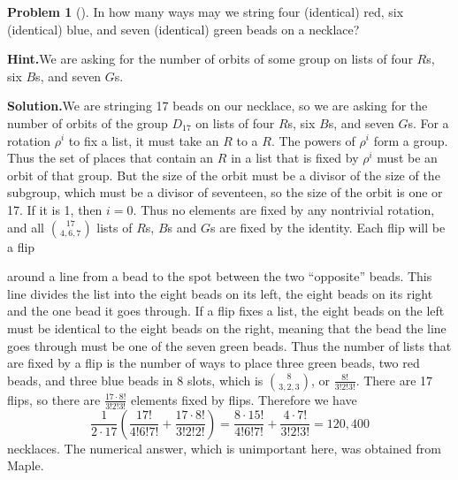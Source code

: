 \documentclass[10pt,]{book}
\theoremstyle{plain}
\theoremstyle{definition}
\newtheorem{activity}[project]{Problem}
\theoremstyle{definition}
\numberwithin{equation}{chapter}
\begin{document}
\begin{activity}[]\label{activity-301}
In how many ways may we string four (identical) red, six (identical) blue, and seven (identical) green beads on a necklace?%
\par\medskip\noindent%
\textbf{Hint.}\quad We are asking for the number of orbits of some group on lists of four \(R\)s, six \(B\)s, and seven \(G\)s.%
\par\medskip\noindent%
\textbf{Solution.}\quad We are stringing 17 beads on our necklace, so we are asking for the number of orbits of the group \(D_{17}\) on lists of four \(R\)s, six \(B\)s, and seven \(G\)s. For a rotation \(\rho^i\) to fix a list, it must take an \(R\) to a \(R\). The powers of \(\rho^i\) form a group. Thus the set of places that contain an \(R\) in a list that is fixed by \(\rho^i\) must be an orbit of that group. But the size of the orbit must be a divisor of the size of the subgroup, which must be a divisor of seventeen, so the size of the orbit is one or 17. If it is 1, then \(i=0\). Thus no elements are fixed by any nontrivial rotation, and all \(\binom{17}{4,6,7}\) lists of \(R\)s, \(B\)s and \(G\)s are fixed by the identity. Each flip will be a flip \strut around a line from a bead to the spot between the two ``opposite'' beads. This line divides the list into the eight beads on its left, the eight beads on its right and the one bead it goes through. If a flip fixes a list, the eight beads on the left must be identical to the eight beads on the right, meaning that the bead the line goes through must be one of the seven green beads. Thus the number of lists that are fixed by a flip is the number of ways to place three green beads, two red beads, and three blue beads in 8 slots, which is \(\binom{8}{3,2,3}\), or \(\frac{8!}{3!2!3!}\). There are 17 flips, so there are \(\frac{17\cdot8!}{3!2!3!}\) elements fixed by flips. Therefore we have%
\begin{equation*}
\frac{1}{2\cdot 17}\left(\frac{17!}{4!6!7!} + \frac{17\cdot8!}{3!2!2!}\right) =
\frac{8\cdot15!}{4!6!7!} + \frac{4\cdot7!}{3!2!3!}= 120,400
\end{equation*}
necklaces. The numerical answer, which is unimportant here, was obtained from Maple.%
\end{activity}
\end{document}
